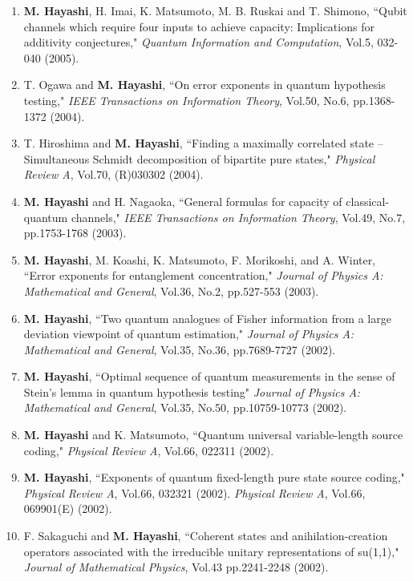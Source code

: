 \documentclass[a4paper,12pt,oneside]{article}
\begin{document}
\begin{enumerate}
\item
\textbf{M. Hayashi}, H. Imai, K. Matsumoto, M. B. Ruskai and T. Shimono, 
``Qubit channels which require four inputs to achieve capacity: Implications for additivity conjectures," 
{\em Quantum Information and Computation}, Vol.5, 032-040 (2005).

\item
T. Ogawa and \textbf{M. Hayashi}, 
``On error exponents in quantum hypothesis testing," 
{\em IEEE Transactions on Information Theory}, Vol.50, No.6, pp.1368-1372 (2004).

\item
T. Hiroshima and \textbf{M. Hayashi}, ``Finding a maximally correlated state -- Simultaneous Schmidt decomposition of bipartite pure states," 
{\em Physical Review A}, Vol.70, (R)030302 (2004).

\item
\textbf{M. Hayashi} and H. Nagaoka, ``General formulas for capacity of classical-quantum channels," 
{\em IEEE Transactions on Information Theory}, Vol.49, No.7, pp.1753-1768 (2003).

\item
\textbf{M. Hayashi}, M. Koashi, K. Matsumoto, F. Morikoshi, and A. Winter, 
``Error exponents for entanglement concentration," 
{\em Journal of Physics A: Mathematical and General}, Vol.36, No.2, pp.527-553 (2003). 

\item
\textbf{M. Hayashi}, ``Two quantum analogues of Fisher information from a large deviation viewpoint of quantum estimation," 
{\em Journal of Physics A: Mathematical and General}, Vol.35, No.36, pp.7689-7727 (2002).

\item
\textbf{M. Hayashi}, ``Optimal sequence of quantum measurements in the sense of Stein's lemma in quantum hypothesis testing" 
{\em Journal of Physics A: Mathematical and General}, Vol.35, No.50, pp.10759-10773 (2002).

\item
\textbf{M. Hayashi} and K. Matsumoto, ``Quantum universal variable-length source coding," 
{\em Physical Review A}, Vol.66, 022311 (2002). 

\item
\textbf{M. Hayashi}, ``Exponents of quantum fixed-length pure state source coding," 
{\em Physical Review A}, Vol.66, 032321 (2002). 
{\em Physical Review A}, Vol.66, 069901(E) (2002).

\item
F. Sakaguchi and \textbf{M. Hayashi}, ``Coherent states and anihilation-creation operators associated with the irreducible unitary representations of su(1,1)," 
{\em Journal of Mathematical Physics}, Vol.43 pp.2241-2248 (2002).


\end{enumerate}
\end{document}
